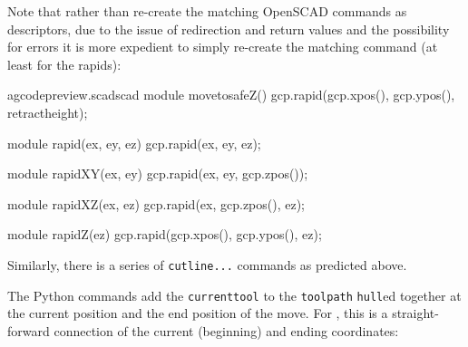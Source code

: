 \documentclass{ltxdoc}
\begin{document}
Note that rather than re-create the matching OpenSCAD commands as descriptors, due to the issue of redirection and return values and the possibility for errors it is more expedient to simply re-create the matching command (at least for the rapids):

\lstset{firstnumber=\thegcpscad}
\begin{writecode}{a}{gcodepreview.scad}{scad}
module movetosafeZ(){
    gcp.rapid(gcp.xpos(), gcp.ypos(), retractheight);
}

module rapid(ex, ey, ez) {
    gcp.rapid(ex, ey, ez);
}

module rapidXY(ex, ey) {
    gcp.rapid(ex, ey, gcp.zpos());
}

module rapidXZ(ex, ez) {
    gcp.rapid(ex, gcp.zpos(), ez);
}

module rapidZ(ez) {
    gcp.rapid(gcp.xpos(), gcp.ypos(), ez);
}

\end{writecode}
\addtocounter{gcpscad}{20}

Similarly, there is a series of \verb|cutline...| commands as predicted above.


The Python commands  add the \verb|currenttool| to the \verb|toolpath| \verb|hull|ed together at the current position and the end position of the move. For , this is a straight-forward connection of the current (beginning) and ending coordinates:
\end{document}
